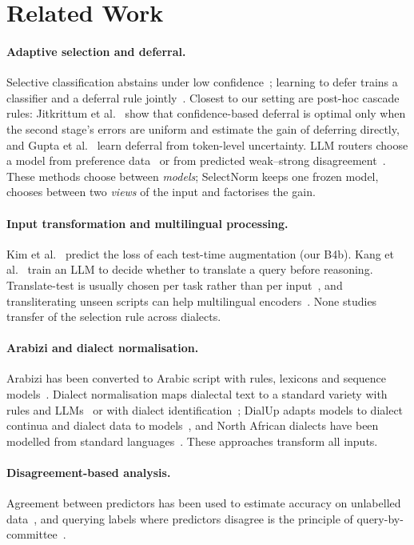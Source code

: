 \section{Related Work}
\label{sec:related}

\paragraph{Adaptive selection and deferral.}
Selective classification abstains under low confidence~\cite{geifman2017selective,geifman2019selectivenet}; learning to defer trains a classifier and a deferral rule jointly~\cite{mozannar2020defer}. Closest to our setting are post-hoc cascade rules: Jitkrittum et al.~\cite{jitkrittum2023cascade} show that confidence-based deferral is optimal only when the second stage's errors are uniform and estimate the gain of deferring directly, and Gupta et al.~\cite{gupta2024cascades} learn deferral from token-level uncertainty. LLM routers choose a model from preference data~\cite{ong2025routellm} or from predicted weak--strong disagreement~\cite{noorani2026disagreement}. These methods choose between \emph{models}; SelectNorm keeps one frozen model, chooses between two \emph{views} of the input and factorises the gain.

\paragraph{Input transformation and multilingual processing.}
Kim et al.~\cite{kim2020learningloss} predict the loss of each test-time augmentation (our B4b). Kang et al.~\cite{kang2026luar} train an LLM to decide whether to translate a query before reasoning. Translate-test is usually chosen per task rather than per input~\cite{artetxe2023revisiting}, and transliterating unseen scripts can help multilingual encoders~\cite{muller2021unseen,moosa2023transliteration}. None studies transfer of the selection rule across dialects.

\paragraph{Arabizi and dialect normalisation.}
Arabizi has been converted to Arabic script with rules, lexicons and sequence models~\cite{darwish2014arabizi,shazal2020unified}. Dialect normalisation maps dialectal text to a standard variety with rules and LLMs~\cite{dimakis2025dialect} or with dialect identification~\cite{alhafni2024exploiting}; DialUp adapts models to dialect continua and dialect data to models~\cite{bafna2025dialup}, and North African dialects have been modelled from standard languages~\cite{toughrai2025modeling}. These approaches transform all inputs.

\paragraph{Disagreement-based analysis.}
Agreement between predictors has been used to estimate accuracy on unlabelled data~\cite{platanios2014estimating,garg2022atc}, and querying labels where predictors disagree is the principle of query-by-committee~\cite{seung1992qbc}.

